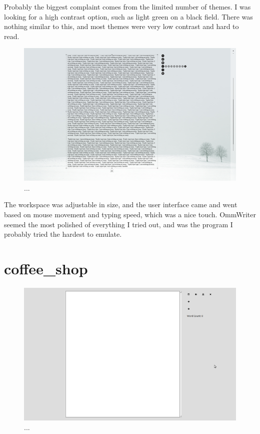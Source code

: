 \documentclass[10pt]{article}
\begin{document}
Probably the biggest complaint comes from the limited number of themes. I was looking for a high contrast option, such as light green on a black field. There was nothing similar to this, and most themes were very low contrast and hard to read.

\begin{figure}
   \centering
      \includegraphics[width=130mm]{images/ommwriter3.png}
   \caption{...}
\end{figure}

The workspace was adjustable in size, and the user interface came and went based on mouse movement and typing speed, which was a nice touch. OmmWriter seemed the most polished of everything I tried out, and was the program I probably tried the hardest to emulate.

\section{coffee\_shop}

\begin{figure}
   \centering
      \includegraphics[width=130mm]{images/coffee_shop1.png}
   \caption{...}
\end{figure}
\end{document}
